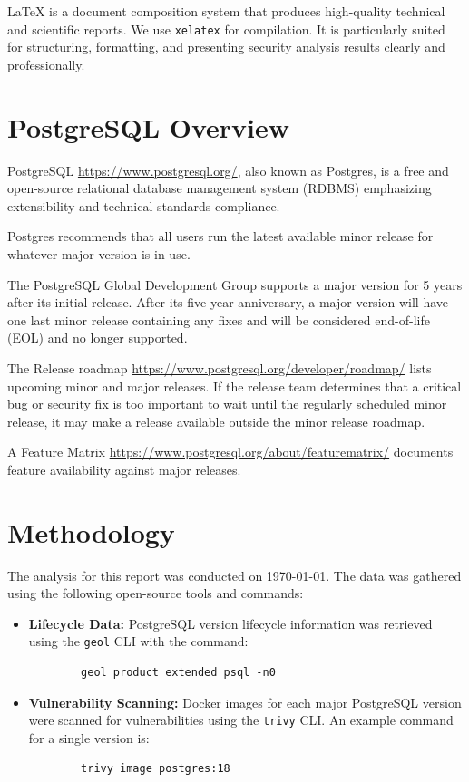 \documentclass[11pt, a4paper]{article}
\begin{document}
\LaTeX{} is a document composition system that produces high-quality technical and scientific reports. We use \texttt{xelatex} for compilation. It is particularly suited for structuring, formatting, and presenting security analysis results clearly and professionally.

\section{PostgreSQL Overview}

PostgreSQL \href{https://www.postgresql.org/}{https://www.postgresql.org/}, also known as Postgres, is a free and open-source relational database management system (RDBMS) emphasizing extensibility and technical standards compliance.

Postgres recommends that all users run the latest available minor release for whatever major version is in use.

The PostgreSQL Global Development Group supports a major version for 5 years after its initial release. After its five-year anniversary, a major version will have one last minor release containing any fixes and will be considered end-of-life (EOL) and no longer supported.

The Release roadmap \href{https://www.postgresql.org/developer/roadmap/}{https://www.postgresql.org/developer/roadmap/} lists upcoming minor and major releases. If the release team determines that a critical bug or security fix is too important to wait until the regularly scheduled minor release, it may make a release available outside the minor release roadmap.

A Feature Matrix \href{https://www.postgresql.org/about/featurematrix/}{https://www.postgresql.org/about/featurematrix/} documents feature availability against major releases.

\section{Methodology}

The analysis for this report was conducted on \today. The data was gathered using the following open-source tools and commands:

\begin{itemize}
    \item \textbf{Lifecycle Data:} PostgreSQL version lifecycle information was retrieved using the \texttt{geol} CLI with the command:
    \begin{verbatim}
        geol product extended psql -n0
    \end{verbatim}
    \item \textbf{Vulnerability Scanning:} Docker images for each major PostgreSQL version were scanned for vulnerabilities using the \texttt{trivy} CLI. An example command for a single version is:
    \begin{verbatim}
        trivy image postgres:18
    \end{verbatim}
\end{itemize}
\end{document}
